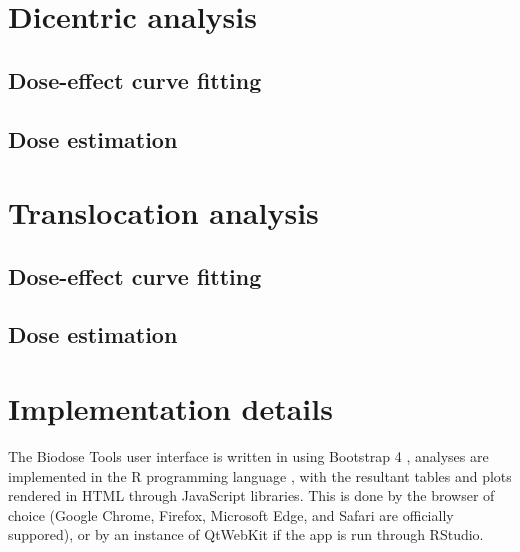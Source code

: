 \documentclass[]{scrartcl}
\begin{document}
\hypertarget{stats-dicent}{%
\section{Dicentric analysis}\label{stats-dicent}}

\hypertarget{dose-effect-curve-fitting}{%
\subsection{Dose-effect curve fitting}\label{dose-effect-curve-fitting}}

\hypertarget{dose-estimation}{%
\subsection{Dose estimation}\label{dose-estimation}}

\hypertarget{stats-trans}{%
\section{Translocation analysis}\label{stats-trans}}

\hypertarget{dose-effect-curve-fitting-1}{%
\subsection{Dose-effect curve fitting}\label{dose-effect-curve-fitting-1}}

\hypertarget{dose-estimation-1}{%
\subsection{Dose estimation}\label{dose-estimation-1}}

\hypertarget{refs}{}

\hypertarget{appendix-appendices}{%
\appendix}


\hypertarget{app:implementation}{%
\section{Implementation details}\label{app:implementation}}

The Biodose Tools user interface is written in \citep{R-shiny} using Bootstrap 4 \citep{R-bs4Dash}, analyses are implemented in the R programming language \citep{R-base}, with the resultant tables and plots rendered in HTML through JavaScript libraries. This is done by the browser of choice (Google Chrome, Firefox, Microsoft Edge, and Safari are officially suppored), or by an instance of QtWebKit if the app is run through RStudio.


\end{document}
